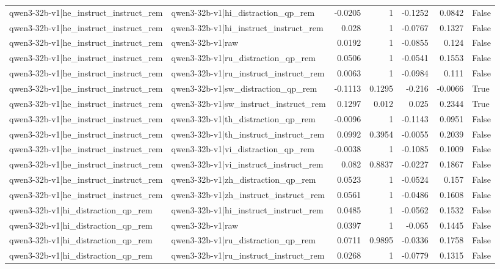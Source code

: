 \begin{table}
\begin{tabular}{l l r r r r l}
qwen3-32b-v1|he_instruct_instruct_rem & qwen3-32b-v1|hi_distraction_qp_rem & -0.0205 & 1 & -0.1252 & 0.0842 & False \\
qwen3-32b-v1|he_instruct_instruct_rem & qwen3-32b-v1|hi_instruct_instruct_rem & 0.028 & 1 & -0.0767 & 0.1327 & False \\
qwen3-32b-v1|he_instruct_instruct_rem & qwen3-32b-v1|raw & 0.0192 & 1 & -0.0855 & 0.124 & False \\
qwen3-32b-v1|he_instruct_instruct_rem & qwen3-32b-v1|ru_distraction_qp_rem & 0.0506 & 1 & -0.0541 & 0.1553 & False \\
qwen3-32b-v1|he_instruct_instruct_rem & qwen3-32b-v1|ru_instruct_instruct_rem & 0.0063 & 1 & -0.0984 & 0.111 & False \\
qwen3-32b-v1|he_instruct_instruct_rem & qwen3-32b-v1|sw_distraction_qp_rem & -0.1113 & 0.1295 & -0.216 & -0.0066 & True \\
qwen3-32b-v1|he_instruct_instruct_rem & qwen3-32b-v1|sw_instruct_instruct_rem & 0.1297 & 0.012 & 0.025 & 0.2344 & True \\
qwen3-32b-v1|he_instruct_instruct_rem & qwen3-32b-v1|th_distraction_qp_rem & -0.0096 & 1 & -0.1143 & 0.0951 & False \\
qwen3-32b-v1|he_instruct_instruct_rem & qwen3-32b-v1|th_instruct_instruct_rem & 0.0992 & 0.3954 & -0.0055 & 0.2039 & False \\
qwen3-32b-v1|he_instruct_instruct_rem & qwen3-32b-v1|vi_distraction_qp_rem & -0.0038 & 1 & -0.1085 & 0.1009 & False \\
qwen3-32b-v1|he_instruct_instruct_rem & qwen3-32b-v1|vi_instruct_instruct_rem & 0.082 & 0.8837 & -0.0227 & 0.1867 & False \\
qwen3-32b-v1|he_instruct_instruct_rem & qwen3-32b-v1|zh_distraction_qp_rem & 0.0523 & 1 & -0.0524 & 0.157 & False \\
qwen3-32b-v1|he_instruct_instruct_rem & qwen3-32b-v1|zh_instruct_instruct_rem & 0.0561 & 1 & -0.0486 & 0.1608 & False \\
qwen3-32b-v1|hi_distraction_qp_rem & qwen3-32b-v1|hi_instruct_instruct_rem & 0.0485 & 1 & -0.0562 & 0.1532 & False \\
qwen3-32b-v1|hi_distraction_qp_rem & qwen3-32b-v1|raw & 0.0397 & 1 & -0.065 & 0.1445 & False \\
qwen3-32b-v1|hi_distraction_qp_rem & qwen3-32b-v1|ru_distraction_qp_rem & 0.0711 & 0.9895 & -0.0336 & 0.1758 & False \\
qwen3-32b-v1|hi_distraction_qp_rem & qwen3-32b-v1|ru_instruct_instruct_rem & 0.0268 & 1 & -0.0779 & 0.1315 & False \\

\end{tabular}
\end{table}
